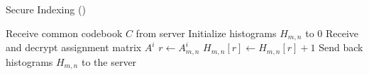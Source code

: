 \begin{algorithm}[t]
\caption{Secure Indexing (\SecInd)}
\label{alg:sec_indexing}
\begin{algorithmic}[1]


      
    \State Receive common codebook $C$ from server 
    \State Initialize histograms $H_{m,n}$ to $0$ 
    \State Receive and decrypt assignment matrix $A^i$ %
            \State $r \leftarrow A^i_{m, n}$ 
            \State $H_{m, n}[r] \leftarrow H_{m, n}[r] + 1$ 
        \EndFor
    \EndFor
    \State Send back histograms $H_{m, n}$ to the server 
\EndProcedure
\end{algorithmic}
\end{algorithm}





